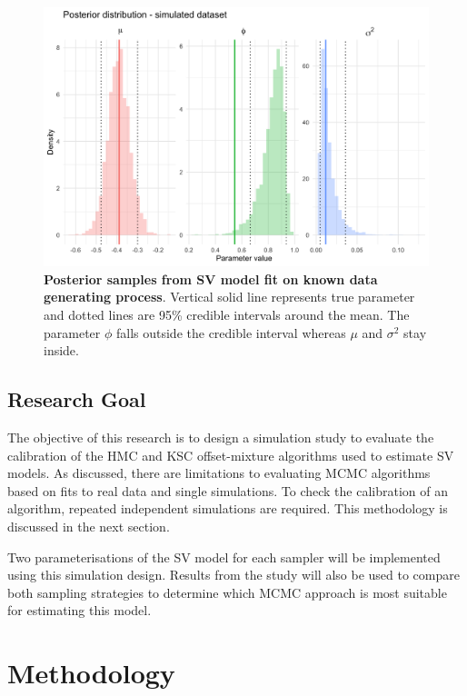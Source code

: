 \documentclass[12pt, a4paper]{article}
\begin{document}
    \begin{figure}[h]
        \centering
        \includegraphics[scale=0.1]{motivating_example/single_sim.png}
        \caption{\textbf{Posterior samples from SV model fit on known data generating process}. Vertical solid line represents true parameter and dotted lines are 95\% credible intervals around the mean. The parameter $\phi$ falls outside the credible interval whereas $\mu$ and $\sigma^2$ stay inside.}
    \end{figure}

\subsection{Research Goal}
    The objective of this research is to design a simulation study to evaluate the calibration of the HMC and KSC offset-mixture algorithms used to estimate SV models. As discussed, there are limitations to evaluating MCMC algorithms based on fits to real data and single simulations. To check the calibration of an algorithm, repeated independent simulations are required. This methodology is discussed in the next section. 

    Two parameterisations of the SV model for each sampler will be implemented using this simulation design. Results from the study will also be used to compare both sampling strategies to determine which MCMC approach is most suitable for estimating this model. 

\section{Methodology}
\end{document}
